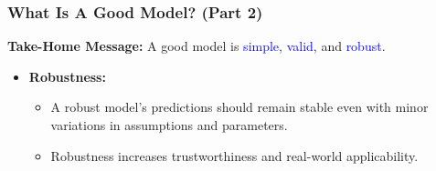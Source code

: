 \documentclass{beamer}
\begin{document}
\begin{frame}
\frametitle{What Is A Good Model? (Part 2)}
\textbf{Take-Home Message:} A good model is \textcolor{blue}{simple}, \textcolor{blue}{valid}, and \textcolor{blue}{robust}.

\small
\begin{itemize}
    \item \textbf{Robustness:}
    \begin{itemize}
        \item A robust model's predictions should remain stable even with minor variations in assumptions and parameters.
        \item Robustness increases trustworthiness and real-world applicability.
    \end{itemize}
\end{itemize}
\end{frame}
%
\end{document}
